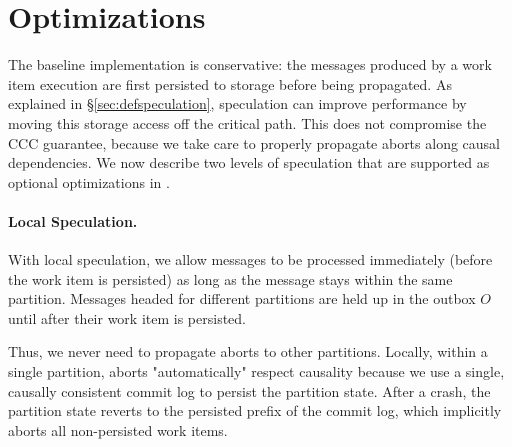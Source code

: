 \section{Optimizations}\label{sec:optimizations}

The baseline \sys implementation is conservative: the messages produced by a work item execution are first persisted to storage before being propagated. As explained in \S\ref{sec:defspeculation}, speculation can improve performance by moving this storage access off the critical path. This does not compromise the CCC guarantee, because we take care to properly propagate aborts along causal dependencies. We now describe two levels of speculation that are supported as optional optimizations in \sys.

\paragraph{Local Speculation.} 

With local speculation, we allow messages to be processed immediately (before the work item is persisted) as long as the message stays within the same partition. 
Messages headed for different partitions are held up in the outbox $O$ until after their work item is persisted.

Thus, we never need to propagate aborts to other partitions. Locally, within a single partition, aborts "automatically" respect causality because we use a single, causally consistent commit log to persist the partition state. After a crash, the partition state reverts to the persisted prefix of the commit log, which implicitly aborts all non-persisted work items.

